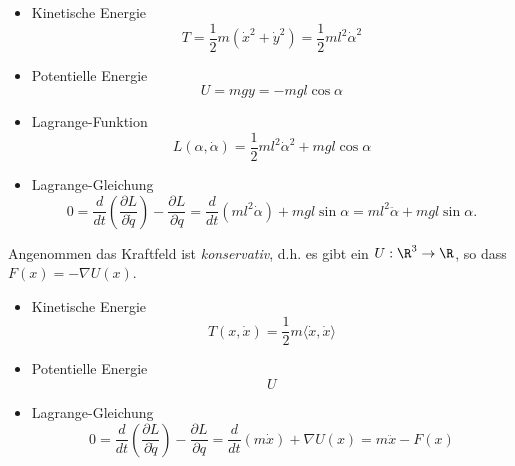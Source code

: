 \begin{bsp}[Pendel]
	\begin{itemize}
		\item Kinetische Energie
		\begin{equation*}
		T = \frac12 m (\dot x^2 + \dot y^2) = \frac12 m l^2 \dot\alpha^2
		\end{equation*}
		\item Potentielle Energie
		\begin{equation*}
		U = mgy = -mgl \cos \alpha
		\end{equation*}
		\item Lagrange-Funktion
		\begin{equation*}
		L(\alpha, \dot\alpha) = \frac12 m l^2 \dot\alpha^2 + mgl \cos \alpha
		\end{equation*}
		\item Lagrange-Gleichung
		\begin{equation*}
		0
		= \frac{d}{dt} \left( \frac{\partial L}{\partial \dot q} \right) - \frac{\partial L}{\partial q}
		= \frac{d}{dt}( ml^2\dot\alpha ) + mgl \sin \alpha
		= ml^2\ddot\alpha + mgl \sin \alpha.
		\end{equation*}
	\end{itemize}
\end{bsp}

\begin{bsp}
	Angenommen das Kraftfeld ist \emph{konservativ}, d.h. es gibt ein $U: \R^3 \to \R$, so dass $F(x) = -\nabla U(x)$.
	\begin{itemize}
		\item Kinetische Energie
		\begin{equation*}
		T(x, \dot x) = \frac12 m \langle \dot x, \dot x \rangle
		\end{equation*}
		\item Potentielle Energie
		\begin{equation*}
		U
		\end{equation*}
		\item Lagrange-Gleichung
		\begin{equation*}
		0
		= \frac{d}{dt} \left( \frac{\partial L}{\partial \dot q} \right) - \frac{\partial L}{\partial q}
		= \frac{d}{dt}(m\dot x) + \nabla U(x) = m\ddot x - F(x)
		\end{equation*}
	\end{itemize}
\end{bsp}

